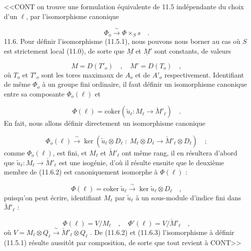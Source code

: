 
<<CONT on trouve une formulation équivalente de 11.5 indépendante du choix d'un $\ell$, par l'isomorphisme canonique

\begin{equation}\tag{11.5.3}
\Phi_o \xrightarrow{\ \sim\ } \Phi \times_S s \quad .
\end{equation}
11.6. Pour définir l'isomorphisme (11.5.1), nous pouvons nous borner au cas où $S$ est strictement local (11.0), de sorte que $\underline{M}$ et $\underline{M}'$ sont constants, de valeurs

\begin{equation}\tag{11.6.1}
M = D(T'_o) \quad , \quad M' = D(T_o) \quad ,
\end{equation}
où $T_o$ et $T'_o$ sont les tores maximaux de $A_o$ et de $A'_o$ respectivement. Identifiant de même $\Phi_o$ à un groupe fini ordinaire, il faut définir un isomorphisme canonique entre sa composante $\Phi_o(\ell)$ et

\begin{equation*}
\Phi(\ell) = \mathrm{coker}(\widetilde{u}_{\ell} : M_{\ell} \longrightarrow \check{M}'_{\ell}) \quad .
\end{equation*}
En fait, nous allons définir directement un isomorphisme canonique

\begin{equation}\tag{11.6.2}
\Phi_o(\ell) \xrightarrow{\ \sim\ } \ker(\widetilde{u}_{\ell}\otimes D_{\ell} \; : \; M_{\ell}\otimes D_{\ell} \longrightarrow \check{M}'_{\ell}\otimes D_{\ell}) \quad ;
\end{equation}
comme $\Phi_o(\ell)$, est fini, et $M_{\ell}$ et $\check{M}'_{\ell}$ ont même rang, il en résultera d'abord que $\widetilde{u}_{\ell} : M_{\ell} \longrightarrow \check{M}'_{\ell}$ est une isogénie, d'où il résulte ensuite que le deuxième membre de (11.6.2) est canoniquement isomorphe à $\Phi(\ell)$ :

\begin{equation}\tag{11.6.3}
\Phi(\ell) = \mathrm{coker}\ \widetilde{u}_{\ell} \xrightarrow{\ \sim\ } \ker \widetilde{u}_{\ell}\otimes D_{\ell} \quad ,
\end{equation}
puisqu'on peut écrire, identifiant $M_{\ell}$ par $\widetilde{u}_{\ell}$ à un sous-module d'indice fini dans $\check{M}'_{\ell}$ :

\begin{equation*}
\Phi(\ell) = V/M_{\ell} \quad , \quad \Phi'(\ell) = V/\check{M}'_{\ell} \quad ,
\end{equation*}
où $V = M_{\ell}\otimes Q_{\ell} \xrightarrow{\ \sim\ } \check{M}'_{\ell}\otimes Q_{\ell}$ . De (11.6.2) et (11.6.3) l'isomorphisme à définir (11.5.1) résulte aussitôt par composition, de sorte que tout revient à CONT>>


